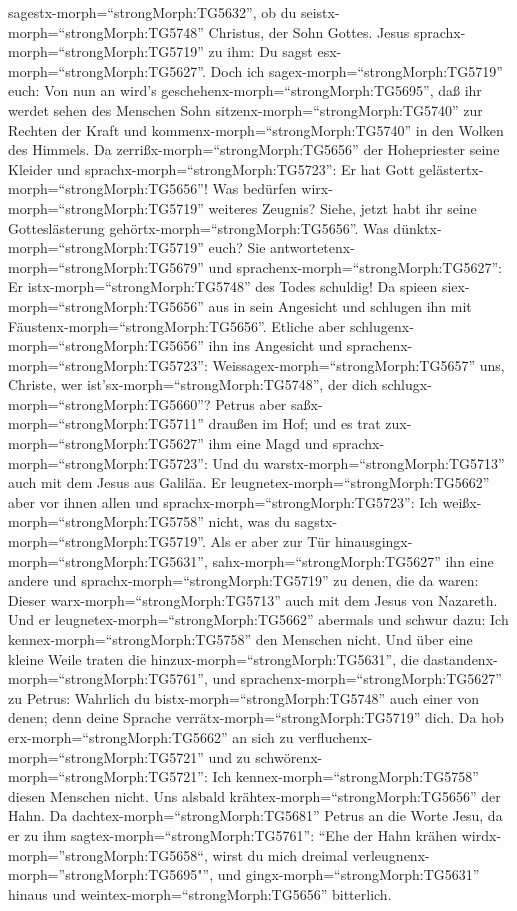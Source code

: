 sagestx-morph=``strongMorph:TG5632'', ob du
seistx-morph=``strongMorph:TG5748'' Christus, der Sohn Gottes.
 Jesus sprachx-morph=``strongMorph:TG5719'' zu ihm: Du
sagst esx-morph=``strongMorph:TG5627''. Doch ich
sagex-morph=``strongMorph:TG5719'' euch: Von nun an wird's
geschehenx-morph=``strongMorph:TG5695'', daß ihr werdet sehen des
Menschen Sohn sitzenx-morph=``strongMorph:TG5740'' zur Rechten der Kraft
und kommenx-morph=``strongMorph:TG5740'' in den Wolken des Himmels.
 Da zerrißx-morph=``strongMorph:TG5656'' der Hohepriester
seine Kleider und sprachx-morph=``strongMorph:TG5723'': Er hat Gott
gelästertx-morph=``strongMorph:TG5656''! Was bedürfen
wirx-morph=``strongMorph:TG5719'' weiteres Zeugnis? Siehe, jetzt habt
ihr seine Gotteslästerung gehörtx-morph=``strongMorph:TG5656''.
 Was dünktx-morph=``strongMorph:TG5719'' euch? Sie
antwortetenx-morph=``strongMorph:TG5679'' und
sprachenx-morph=``strongMorph:TG5627'': Er
istx-morph=``strongMorph:TG5748'' des Todes schuldig!  Da
spieen siex-morph=``strongMorph:TG5656'' aus in sein Angesicht und
schlugen ihn mit Fäustenx-morph=``strongMorph:TG5656''. Etliche aber
schlugenx-morph=``strongMorph:TG5656'' ihn ins Angesicht 
und sprachenx-morph=``strongMorph:TG5723'':
Weissagex-morph=``strongMorph:TG5657'' uns, Christe, wer
ist'sx-morph=``strongMorph:TG5748'', der dich
schlugx-morph=``strongMorph:TG5660''?  Petrus aber
saßx-morph=``strongMorph:TG5711'' draußen im Hof; und es trat
zux-morph=``strongMorph:TG5627'' ihm eine Magd und
sprachx-morph=``strongMorph:TG5723'': Und du
warstx-morph=``strongMorph:TG5713'' auch mit dem Jesus aus Galiläa.
 Er leugnetex-morph=``strongMorph:TG5662'' aber vor ihnen
allen und sprachx-morph=``strongMorph:TG5723'': Ich
weißx-morph=``strongMorph:TG5758'' nicht, was du
sagstx-morph=``strongMorph:TG5719''.  Als er aber zur Tür
hinausgingx-morph=``strongMorph:TG5631'',
sahx-morph=``strongMorph:TG5627'' ihn eine andere und
sprachx-morph=``strongMorph:TG5719'' zu denen, die da waren: Dieser
warx-morph=``strongMorph:TG5713'' auch mit dem Jesus von Nazareth.
 Und er leugnetex-morph=``strongMorph:TG5662'' abermals und
schwur dazu: Ich kennex-morph=``strongMorph:TG5758'' den Menschen nicht.
 Und über eine kleine Weile traten die
hinzux-morph=``strongMorph:TG5631'', die
dastandenx-morph=``strongMorph:TG5761'', und
sprachenx-morph=``strongMorph:TG5627'' zu Petrus: Wahrlich du
bistx-morph=``strongMorph:TG5748'' auch einer von denen; denn deine
Sprache verrätx-morph=``strongMorph:TG5719'' dich.  Da hob
erx-morph=``strongMorph:TG5662'' an sich zu
verfluchenx-morph=``strongMorph:TG5721'' und zu
schwörenx-morph=``strongMorph:TG5721'': Ich
kennex-morph=``strongMorph:TG5758'' diesen Menschen nicht. Uns alsbald
krähtex-morph=``strongMorph:TG5656'' der Hahn.  Da
dachtex-morph=``strongMorph:TG5681'' Petrus an die Worte Jesu, da er zu
ihm sagtex-morph=``strongMorph:TG5761'': ``Ehe der Hahn krähen
wirdx-morph=''strongMorph:TG5658``, wirst du mich dreimal
verleugnenx-morph=''strongMorph:TG5695"'', und
gingx-morph=``strongMorph:TG5631'' hinaus und
weintex-morph=``strongMorph:TG5656'' bitterlich.

